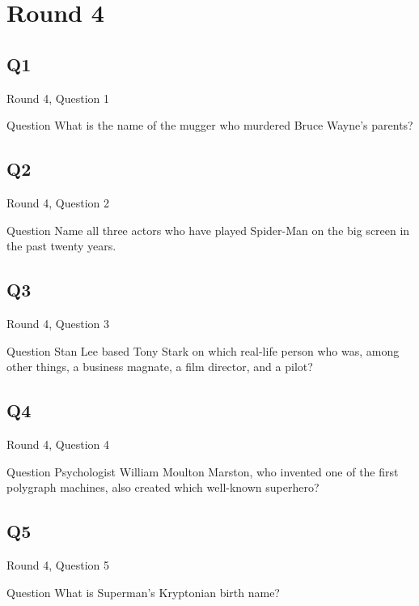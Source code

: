\documentclass[11pt]{beamer}
\begin{document}
\section{Round 4}
\subsection*{Q1}
\begin{frame}[t]{Round 4, Question 1}
\begin{block}{Question}
What is the name of the mugger who murdered Bruce Wayne's parents?
\end{block}
\end{frame}
\subsection*{Q2}
\begin{frame}[t]{Round 4, Question 2}
\begin{block}{Question}
Name all three actors who have played Spider-Man on the big screen in the past twenty years.
\end{block}
\end{frame}
\subsection*{Q3}
\begin{frame}[t]{Round 4, Question 3}
\begin{block}{Question}
Stan Lee based Tony Stark on which real-life person who was, among other things, a business magnate, a film director, and a pilot?
\end{block}
\end{frame}
\subsection*{Q4}
\begin{frame}[t]{Round 4, Question 4}
\begin{block}{Question}
Psychologist William Moulton Marston, who invented one of the first polygraph machines, also created which well-known superhero?
\end{block}
\end{frame}
\subsection*{Q5}
\begin{frame}[t]{Round 4, Question 5}
\begin{block}{Question}
What is Superman's Kryptonian birth name?
\end{block}
\end{frame}
\end{document}
